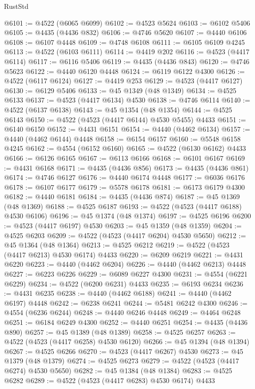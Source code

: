 \begin{lexlean}{RustStd}
\begin{coremodule}
{\begin{coremodule}
{{{{{{{{{{{{{{{{{{{{{{{{{{{{{{{{{{{{{{{{{{{{{{{{{{{{{{{{{{{{@6101 := @4522 (@6065 @6099)
@6102 := @4523 @5624
@6103 := @6102 @5406
@6105 := @4435 (@4436 @832)
@6106 := @4746 @5620
@6107 := @4440 @6106
@6108 := @6107 @4448
@6109 := @4748 @6108
@6111 := @6105 @6109 @4245
@6113 := @4522 (@6103 @6111)
@6114 := @4419 @202
@6116 := @4523 (@4417 @6114)
@6117 := @6116 @5406
@6119 := @4435 (@4436 @843)
@6120 := @4746 @5623
@6122 := @4440 @6120 @4448
@6124 := @6119 @6122 @4300
@6126 := @4522 (@6117 @6124)
@6127 := @4419 @253
@6129 := @4523 (@4417 @6127)
@6130 := @6129 @5406
@6133 := @45 @1349 (@48 @1349)
@6134 := @4525 @6133
@6137 := @4523 (@4417 @6134) @4530
@6138 := @4746 @6114
@6140 := @4522 (@6137 @6138)
@6143 := @45 @1354 (@48 @1354)
@6144 := @4525 @6143
@6150 := @4522 (@4523 (@4417 @6144) @4530 @5455) @4433
@6151 := @6140 @6150
@6152 := @4431 @6151
@6154 := @4440 (@4462 @6134)
@6157 := @4440 (@4462 @6144) @4448
@6158 := @6154 @6157
@6160 := @5548 @6158 @4245
@6162 := @4554 (@6152 @6160)
@6165 := @4522 (@6130 @6162) @4433
@6166 := @6126 @6165
@6167 := @6113 @6166
@6168 := @6101 @6167
@6169 := @4431 @6168
@6171 := @4435 (@4436 @856)
@6173 := @4435 (@4436 @861)
@6174 := @4746 @6127
@6176 := @4440 @6174 @4448
@6177 := @6036 @6176
@6178 := @6107 @6177
@6179 := @5578 @6178
@6181 := @6173 @6179 @4300
@6182 := @4440 @6181
@6184 := @4435 (@4436 @874)
@6187 := @45 @1369 (@48 @1369)
@6188 := @4525 @6187
@6193 := @4522 (@4523 (@4417 @6188) @4530 @6106)
@6196 := @45 @1374 (@48 @1374)
@6197 := @4525 @6196
@6200 := @4523 (@4417 @6197) @4530
@6203 := @45 @1359 (@48 @1359)
@6204 := @4525 @6203
@6209 := @4522 (@4523 (@4417 @6204) @4530 @5650)
@6212 := @45 @1364 (@48 @1364)
@6213 := @4525 @6212
@6219 := @4522 (@4523 (@4417 @6213) @4530 @6174) @4433
@6220 := @6209 @6219
@6221 := @4431 @6220
@6223 := @4440 (@4462 @6204)
@6226 := @4440 (@4462 @6213) @4448
@6227 := @6223 @6226
@6229 := @6089 @6227 @4300
@6231 := @4554 (@6221 @6229)
@6234 := @4522 (@6200 @6231) @4433
@6235 := @6193 @6234
@6236 := @4431 @6235
@6238 := @4440 (@4462 @6188)
@6241 := @4440 (@4462 @6197) @4448
@6242 := @6238 @6241
@6244 := @5481 @6242 @4300
@6246 := @4554 (@6236 @6244)
@6248 := @4440 @6246 @4448
@6249 := @4464 @6248
@6251 := @6184 @6249 @4300
@6252 := @4440 @6251
@6254 := @4435 (@4436 @890)
@6257 := @45 @1389 (@48 @1389)
@6258 := @4525 @6257
@6263 := @4522 (@4523 (@4417 @6258) @4530 @6120)
@6266 := @45 @1394 (@48 @1394)
@6267 := @4525 @6266
@6270 := @4523 (@4417 @6267) @4530
@6273 := @45 @1379 (@48 @1379)
@6274 := @4525 @6273
@6279 := @4522 (@4523 (@4417 @6274) @4530 @5650)
@6282 := @45 @1384 (@48 @1384)
@6283 := @4525 @6282
@6289 := @4522 (@4523 (@4417 @6283) @4530 @6174) @4433
}}}}}}}}}}}}}}}}}}}}}}}}}}}}}}}}}}}}}}}}}}}}}}}}}}}}}}}}}}}}
\end{coremodule}}
\end{coremodule}
\end{lexlean}

